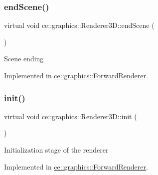 \mbox{\label{classce_1_1graphics_1_1_renderer3_d_a0b8feaf1dd7f6ee03c7be2197d012e25}} 
\subsubsection{\texorpdfstring{end\+Scene()}{endScene()}}
{\footnotesize\ttfamily virtual void ce\+::graphics\+::\+Renderer3\+D\+::end\+Scene (\begin{DoxyParamCaption}{ }\end{DoxyParamCaption})\hspace{0.3cm}{\ttfamily [pure virtual]}}

Scene ending 

Implemented in \hyperlink{classce_1_1graphics_1_1_forward_renderer_a34bf60e44a9a594ab596f46ca7688e3e}{ce\+::graphics\+::\+Forward\+Renderer}.

\mbox{\label{classce_1_1graphics_1_1_renderer3_d_ae887bbdc74af40838e6d059d30bb430b}} 
\subsubsection{\texorpdfstring{init()}{init()}}
{\footnotesize\ttfamily virtual void ce\+::graphics\+::\+Renderer3\+D\+::init (\begin{DoxyParamCaption}{ }\end{DoxyParamCaption})\hspace{0.3cm}{\ttfamily [pure virtual]}}

Initialization stage of the renderer 

Implemented in \hyperlink{classce_1_1graphics_1_1_forward_renderer_ac6c7ad9a18ecfb2cbb6aee202e7e2e8f}{ce\+::graphics\+::\+Forward\+Renderer}.

\mbox{\label{classce_1_1graphics_1_1_renderer3_d_a7b258350b5af957550a2d29800d3c5b7}} 
